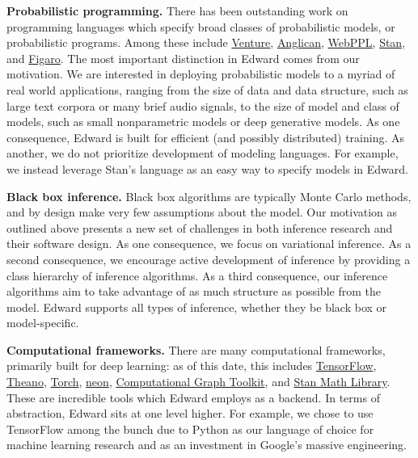 \textbf{Probabilistic programming.}
There has been outstanding work on programming languages which specify
broad classes of probabilistic models, or probabilistic
programs. Among these include
\href{http://probcomp.csail.mit.edu/venture/}{Venture},
\href{http://www.robots.ox.ac.uk/~fwood/anglican/literature/index.html}{Anglican},
\href{http://webppl.org}{WebPPL},
\href{http://mc-stan.org}{Stan}, and
\href{https://www.cra.com/work/case-studies/figaro}{Figaro}.
The most important distinction in Edward comes from our motivation.
We are interested in deploying probabilistic models to a myriad of
real world applications, ranging from the size of data and
data structure, such as large text corpora or many brief audio signals,
to the size of model and class of models, such as small nonparametric
models or deep generative models.
As one consequence, Edward is built for efficient (and possibly
distributed) training. As another, we do not prioritize development of
modeling languages. For example, we instead leverage Stan's
language as an easy way to specify models in Edward.

\textbf{Black box inference.}
Black box algorithms are typically Monte Carlo methods, and
by design make very few assumptions about the model.
Our motivation as outlined above presents a new set of
challenges in both inference research and their software design.
As one consequence, we focus on variational inference.
As a second consequence, we encourage active development
of inference by providing a class hierarchy of inference algorithms.
As a third consequence, our inference
algorithms aim to take advantage of as much structure as possible from
the model. Edward supports all types of inference, whether they
be black box or model-specific.

\textbf{Computational frameworks.}
There are many computational frameworks, primarily built for deep
learning: as of this date, this includes
\href{https://www.tensorflow.org}{TensorFlow},
\href{http://deeplearning.net/software/theano/}{Theano},
\href{http://torch.ch}{Torch},
\href{https://github.com/NervanaSystems/neon}{neon},
\href{http://rll.berkeley.edu/cgt/}{Computational Graph Toolkit}, and
\href{https://github.com/stan-dev/math}{Stan Math Library}. These are
incredible tools which Edward employs as a backend. In
terms of abstraction, Edward sits at one level higher. For example,
we chose to use TensorFlow among the bunch due to Python as our language
of choice for machine learning research and as an investment in Google's
massive engineering.

